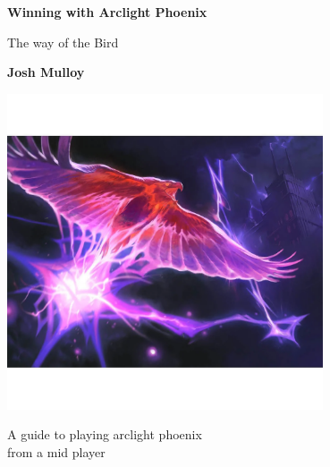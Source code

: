 \documentclass[12pt]{article}
\begin{document}
\begin{titlepage}
    \begin{center}
        \vspace*{1cm}

        \textbf{Winning with Arclight Phoenix}

        \vspace{0.5cm}
        The way of the Bird

        \vspace{1.5cm}

        \textbf{Josh Mulloy}

        \vspace{0.8cm}

        \includegraphics[width=0.7\textwidth]{arclight}

        \vfill

        A guide to playing arclight phoenix\\
        from a mid player
    \end{center}
\end{titlepage}

\tableofcontents

\clearpage
\end{document}
